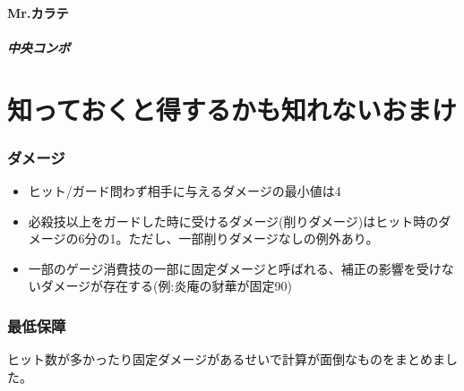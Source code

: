 \documentclass[a4j,11pt]{jarticle}
\begin{document}
\subsection{Mr.カラテ}
\subsubsection{中央コンボ}

\part{知っておくと得するかも知れないおまけ}
\section{ダメージ}
\begin{itemize}
  \item ヒット/ガード問わず相手に与えるダメージの最小値は4
  \item 必殺技以上をガードした時に受けるダメージ(削りダメージ)はヒット時のダメージの6分の1。ただし、一部削りダメージなしの例外あり。
  \item 一部のゲージ消費技の一部に固定ダメージと呼ばれる、補正の影響を受けないダメージが存在する(例:炎庵の豺華が固定90)
\end{itemize}
\newpage
\section{最低保障}
ヒット数が多かったり固定ダメージがあるせいで計算が面倒なものをまとめました。
\end{document}

